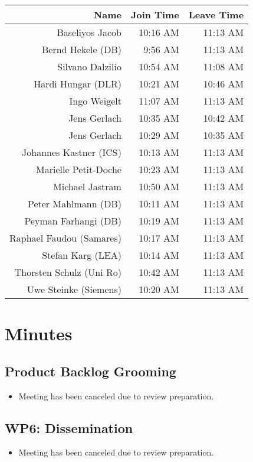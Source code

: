 \documentclass[a4paper, 11pt]{article}
\begin{document}
\begin{table}[htbp]
    \begin{tabular}{rrr}
    \toprule
    \textbf{Name} & \textbf{Join Time} & \textbf{Leave Time} \\
    \midrule
    Baseliyos Jacob & 10:16 AM & 11:13 AM \\
    Bernd Hekele (DB) & 9:56 AM & 11:13 AM \\
    Silvano Dalzilio & 10:54 AM & 11:08 AM \\
    Hardi Hungar (DLR) & 10:21 AM & 10:46 AM \\
    Ingo Weigelt & 11:07 AM & 11:13 AM \\
    Jens Gerlach & 10:35 AM & 10:42 AM \\
    Jens Gerlach & 10:29 AM & 10:35 AM \\
    Johannes Kastner (ICS) & 10:13 AM & 11:13 AM \\
    Marielle Petit-Doche & 10:23 AM & 11:13 AM \\
    Michael Jastram & 10:50 AM & 11:13 AM \\
    Peter Mahlmann (DB)& 10:11 AM & 11:13 AM \\
    Peyman Farhangi (DB)& 10:19 AM & 11:13 AM \\
    Raphael Faudou (Samares) & 10:17 AM & 11:13 AM \\
    Stefan Karg (LEA) & 10:14 AM & 11:13 AM \\
    Thorsten Schulz (Uni Ro) & 10:42 AM & 11:13 AM \\
    Uwe Steinke (Siemens) & 10:20 AM & 11:13 AM \\
     \bottomrule
    \end{tabular}%
  \label{tab:addlabel}%
\end{table}%




\section{Minutes}

\subsection{Product Backlog Grooming}
\begin{itemize}
\item Meeting has been canceled due to review preparation.
\end{itemize}

\subsection{WP6: Dissemination}
\begin{itemize}
\item Meeting has been canceled due to review preparation.
\end{itemize}
\end{document}

